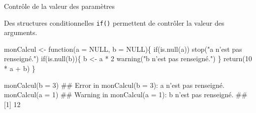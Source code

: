 \documentclass[12pt,ignorenonframetext,]{beamer}
\newenvironment{Shaded}{}{}
\newcommand{\ControlFlowTok}[1]{\textcolor[rgb]{0.00,0.00,1.00}{#1}}
\newcommand{\DataTypeTok}[1]{#1}
\newcommand{\DecValTok}[1]{#1}
\newcommand{\KeywordTok}[1]{\textcolor[rgb]{0.00,0.00,1.00}{#1}}
\newcommand{\NormalTok}[1]{#1}
\newcommand{\OperatorTok}[1]{#1}
\newcommand{\OtherTok}[1]{\textcolor[rgb]{1.00,0.25,0.00}{#1}}
\newcommand{\StringTok}[1]{\textcolor[rgb]{0.00,0.50,0.50}{#1}}
\renewenvironment{Shaded}{\begin{snugshade}}{\end{snugshade}}
\begin{document}
\begin{frame}[fragile]{Contrôle de la valeur des paramètres}
\protect\hypertarget{controle-de-la-valeur-des-parametres}{}

Des structures conditionnelles \texttt{if()} permettent de contrôler la
valeur des arguments.

\pause \footnotesize

\begin{Shaded}
\begin{Highlighting}[]
\NormalTok{monCalcul <-}\StringTok{ }\ControlFlowTok{function}\NormalTok{(}\DataTypeTok{a =} \OtherTok{NULL}\NormalTok{, }\DataTypeTok{b =} \OtherTok{NULL}\NormalTok{)\{}
  \ControlFlowTok{if}\NormalTok{(}\KeywordTok{is.null}\NormalTok{(a)) }\KeywordTok{stop}\NormalTok{(}\StringTok{"a n'est pas renseigné."}\NormalTok{)}
  \ControlFlowTok{if}\NormalTok{(}\KeywordTok{is.null}\NormalTok{(b))\{}
\NormalTok{    b <-}\StringTok{ }\NormalTok{a }\OperatorTok{*}\StringTok{ }\DecValTok{2}
    \KeywordTok{warning}\NormalTok{(}\StringTok{"b n'est pas renseigné."}\NormalTok{)}
\NormalTok{  \}}
  \KeywordTok{return}\NormalTok{(}\DecValTok{10} \OperatorTok{*}\StringTok{ }\NormalTok{a }\OperatorTok{+}\StringTok{ }\NormalTok{b)}
\NormalTok{\}}

\KeywordTok{monCalcul}\NormalTok{(}\DataTypeTok{b =} \DecValTok{3}\NormalTok{)}
\NormalTok{  ## Error in monCalcul(b = 3): a n'est pas renseigné.}
\KeywordTok{monCalcul}\NormalTok{(}\DataTypeTok{a =} \DecValTok{1}\NormalTok{)}
\NormalTok{  ## Warning in monCalcul(a = 1): b n'est pas renseigné.}
\NormalTok{  ## [1] 12}
\end{Highlighting}
\end{Shaded}

\end{frame}
\end{document}
